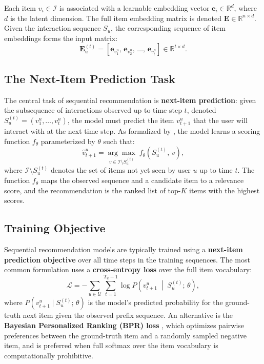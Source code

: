 \documentclass[12pt,a4paper]{report}
\newcommand{\textcite}[1]{\citet{#1}}
\newcommand{\parencite}[1]{\citep{#1}}
\begin{document}
Each item $v_i \in \mathcal{I}$ is associated with a learnable
embedding vector $\mathbf{e}_i \in \mathbb{R}^d$, where $d$ is the
latent dimension. The full item embedding matrix is denoted
$\mathbf{E} \in \mathbb{R}^{n \times d}$. Given the interaction
sequence $S_u$, the corresponding sequence of item embeddings forms
the input matrix:
\begin{equation}
  \mathbf{E}_u^{(t)} =
    \left[ \mathbf{e}_{v_1^u},\, \mathbf{e}_{v_2^u},\,
           \ldots,\, \mathbf{e}_{v_t^u} \right]
    \in \mathbb{R}^{t \times d}.
\end{equation}

\subsection{The Next-Item Prediction Task}

The central task of sequential recommendation is
\textbf{next-item prediction}: given the subsequence of interactions
observed up to time step $t$, denoted
$S_u^{(t)} = (v_1^u, \ldots, v_t^u)$, the model must predict the
item $v_{t+1}^u$ that the user will interact with at the next time
step. As formalized by \textcite{kang2018self}, the model learns a
scoring function $f_\theta$ parameterized by $\theta$ such that:
\begin{equation}
  \hat{v}_{t+1}^u = \underset{v \in \mathcal{I} \setminus S_u^{(t)}}
                    {\arg\max} \; f_\theta\!\left(S_u^{(t)},\, v\right),
\end{equation}
where $\mathcal{I} \setminus S_u^{(t)}$ denotes the set of items not
yet seen by user $u$ up to time $t$. The function $f_\theta$ maps
the observed sequence and a candidate item to a relevance score,
and the recommendation is the ranked list of top-$K$ items with
the highest scores.

\subsection{Training Objective}

Sequential recommendation models are typically trained using a
\textbf{next-item prediction objective} over all time steps in the
training sequences. The most common formulation uses a
\textbf{cross-entropy loss} over the full item vocabulary:
\begin{equation}
  \mathcal{L} = - \sum_{u \in \mathcal{U}} \sum_{t=1}^{T_u - 1}
    \log P\!\left( v_{t+1}^u \;\middle|\; S_u^{(t)};\, \theta \right),
\end{equation}
where $P(v_{t+1}^u \mid S_u^{(t)};\, \theta)$ is the model's
predicted probability for the ground-truth next item given the
observed prefix sequence. An alternative is the
\textbf{Bayesian Personalized Ranking (BPR) loss}
\parencite{hidasi2016gru4rec}, which optimizes pairwise preferences
between the ground-truth item and a randomly sampled negative item,
and is preferred when full softmax over the item vocabulary is
computationally prohibitive.
\end{document}
